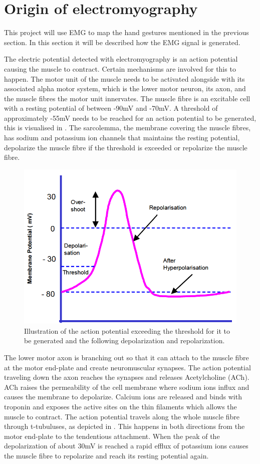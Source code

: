 \section{Origin of electromyography} \label{sec:physiology}
This project will use EMG to map the hand gestures mentioned in the previous section. In this section it will be described how the EMG signal is generated.%

The electric potential detected with electromyography is an action potential causing the muscle to contract. Certain mechanisms are involved for this to happen. The motor unit of the muscle needs to be activated alongside with its associated alpha motor system, which is the lower motor neuron, its axon, and the muscle fibres the motor unit innervates. The muscle fibre is an excitable cell with a resting potential of between -90mV and -70mV. A threshold of approximately -55mV needs to be reached for an action potential to be generated, this is visualised in . The sarcolemma, the membrane covering the muscle fibres, has sodium and potassium ion channels that maintains the resting potential, depolarize the muscle fibre if the threshold is exceeded or repolarize the muscle fibre. \cite{cram2012}


\begin{figure}[H]
	\includegraphics[width=.4\textwidth]{figures/Anatomy/action_potential}  %
	\caption{Illustration of the action potential exceeding the threshold for it to be generated and the following depolarization and repolarization. \cite{konrad2005}}
	\label{fig:action_potential}  %
\end{figure}

The lower motor axon is branching out so that it can attach to the muscle fibre at the motor end-plate and create neuromuscular synapses. The action potential traveling down the axon reaches the synapses and releases Acetylcholine (ACh). ACh raises the permeability of the cell membrane where sodium ions influx and causes the membrane to depolarize. Calcium ions are released and binds with troponin and exposes the active sites on the thin filaments which allows the muscle to contract. The action potential travels along the whole muscle fibre through t-tubuluses, as depicted in . This happens in both directions from the motor end-plate to the tendentious attachment. When the peak of the depolarization of about 30mV is reached a rapid efflux of potassium ions causes the muscle fibre to repolarize and reach its resting potential again. \cite{cram2012}


